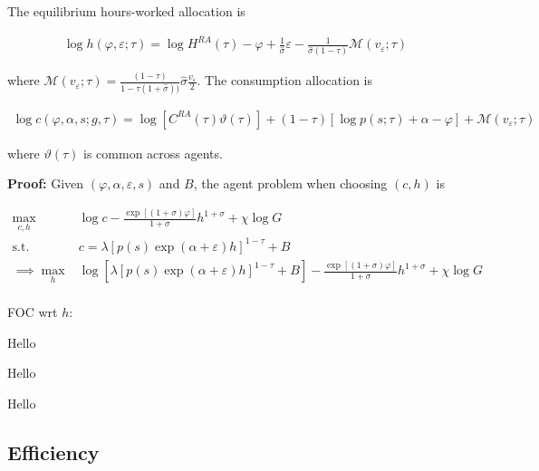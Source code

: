 \documentclass{article}
\newcommand{\M}{\mathcal{M}}
\begin{document}
{
\proposition The equilibrium hours-worked allocation is

\begin{align}
\log h(\varphi, \varepsilon; \tau) = \log H^{RA}(\tau) - \varphi + \frac{1}{\hat{\sigma}} \varepsilon - \frac{1}{\hat \sigma (1- \tau)} \M (v_\varepsilon; \tau)
\end{align}

where $\M ( v_\varepsilon; \tau) = \frac{(1-\tau)}{1 - \tau(1+\hat \sigma))}{\hat \sigma} \frac{v_\varepsilon}{2}$. The consumption allocation is 

\begin{align}
\log c(\varphi, \alpha, s; g, \tau) = \log [C^{RA}(\tau)\vartheta(\tau)] + (1 - \tau) [\log p(s; \tau) + \alpha - \varphi] + \M (v_\varepsilon; \tau)
\end{align}

where $\vartheta(\tau)$ is common across agents.

}


\bigskip

\textbf{Proof:} Given $(\varphi, \alpha, \varepsilon, s)$ and $B$, the agent problem when choosing $(c, h)$ is

\begin{align*}
\max_{c, h} & \log c - \frac{\exp[(1+\sigma)\varphi]}{1 + \sigma} h^{1+\sigma} + \chi \log G \\
\text{s.t. }
&c = \lambda[p(s) \exp(\alpha + \varepsilon)h]^{1-\tau} + B \\
\implies 
\max_{h} & \log [\lambda[p(s) \exp(\alpha + \varepsilon)h]^{1-\tau} + B] - \frac{\exp[(1+\sigma)\varphi]}{1 + \sigma} h^{1+\sigma} + \chi \log G \\
\end{align*}

FOC wrt $h$:



{
\proposition Hello

}

{
\corollary Hello

}

{
\corollary Hello

}

\subsection{Efficiency}
\end{document}
